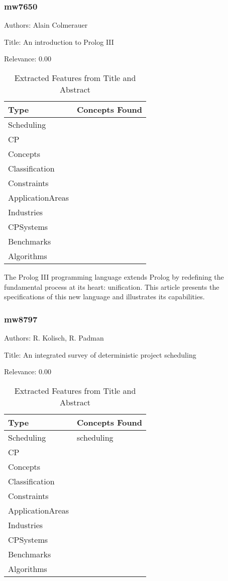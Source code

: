 \subsubsection{mw7650}
\label{mw:mw7650}

Authors: Alain Colmerauer

Title: An introduction to Prolog III

Relevance:  0.00

{\scriptsize
\begin{longtable}{p{2cm}p{20cm}}
\caption{Extracted Features from Title and Abstract}\\ \toprule
Type & Concepts Found\\ \midrule
\endhead
\bottomrule
\endfoot
Scheduling & \\ 
CP & \\ 
Concepts & \\ 
Classification & \\ 
Constraints & \\ 
ApplicationAreas & \\ 
Industries & \\ 
CPSystems & \\ 
Benchmarks & \\ 
Algorithms & \\ 
\end{longtable}
}

 The Prolog III programming language extends Prolog by redefining the fundamental process at its heart: unification. This article presents the specifications of this new language and illustrates its capabilities. 

\subsubsection{mw8797}
\label{mw:mw8797}

Authors: R. Kolisch, R. Padman

Title: An integrated survey of deterministic project scheduling

Relevance:  0.00

{\scriptsize
\begin{longtable}{p{2cm}p{20cm}}
\caption{Extracted Features from Title and Abstract}\\ \toprule
Type & Concepts Found\\ \midrule
\endhead
\bottomrule
\endfoot
Scheduling & scheduling\\ 
CP & \\ 
Concepts & \\ 
Classification & \\ 
Constraints & \\ 
ApplicationAreas & \\ 
Industries & \\ 
CPSystems & \\ 
Benchmarks & \\ 
Algorithms & \\ 
\end{longtable}
}



